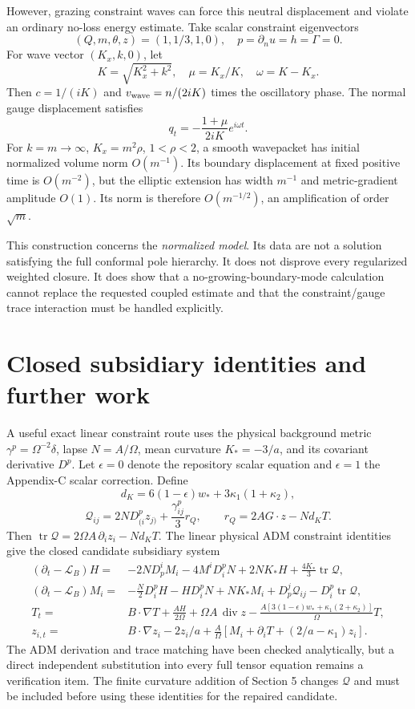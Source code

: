 \documentclass[11pt]{article}
\newcommand{\Tr}{\operatorname{tr}}
\begin{document}
However, grazing constraint waves can force this neutral displacement and violate an ordinary no-loss energy estimate. Take scalar constraint eigenvectors
\[
(Q,m,\theta,z)=(1,1/3,1,0),\quad p=\partial_nu=h=\Gamma=0.
\]
For wave vector $(K_x,k,0)$, let
\[
K=\sqrt{K_x^2+k^2},\quad \mu=K_x/K,\quad \omega=K-K_x.
\]
Then $c=1/(iK)$ and $v_{\rm wave}=n/(2iK)$ times the oscillatory phase. The normal gauge displacement satisfies
\[
q_t=-\frac{1+\mu}{2iK}e^{i\omega t}.
\]
For $k=m\to\infty$, $K_x=m^2\rho$, $1<\rho<2$, a smooth wavepacket has initial normalized volume norm $O(m^{-1})$. Its boundary displacement at fixed positive time is $O(m^{-2})$, but the elliptic extension has width $m^{-1}$ and metric-gradient amplitude $O(1)$. Its norm is therefore $O(m^{-1/2})$, an amplification of order $\sqrt m$.

This construction concerns the \emph{normalized model}. Its data are not a solution satisfying the full conformal pole hierarchy. It does not disprove every regularized weighted closure. It does show that a no-growing-boundary-mode calculation cannot replace the requested coupled estimate and that the constraint/gauge trace interaction must be handled explicitly.

\section{Closed subsidiary identities and further work}
A useful exact linear constraint route uses the physical background metric $\gamma^p=\Omega^{-2}\delta$, lapse $N=A/\Omega$, mean curvature $K_*=-3/a$, and its covariant derivative $D^p$. Let $\epsilon=0$ denote the repository scalar equation and $\epsilon=1$ the Appendix-C scalar correction. Define
\[
d_K=6(1-\epsilon)w_*+3\kappa_1(1+\kappa_2),
\]
\[
\mathcal Q_{ij}=2N D^p_{(i}z_{j)}+\frac{\gamma^p_{ij}}3 r_Q,
\qquad
r_Q=2A G\cdot z-Nd_KT .
\]
Then $\Tr\mathcal Q=2\Omega A\,\partial_i z_i-Nd_KT$.
The linear physical ADM constraint identities give the closed candidate subsidiary system
\begin{align}
(\partial_t-\mathcal L_B)H={}&-2N D_p^iM_i-4M^iD_i^pN+2NK_*H
+\frac{4K_*}{3}\Tr\mathcal Q,\\
(\partial_t-\mathcal L_B)M_i={}&-\frac N2 D_i^pH-H D_i^pN
+NK_*M_i+D_p^j\mathcal Q_{ij}-D_i^p\Tr\mathcal Q,\\
T_t={}&B\cdot\nabla T+\frac{AH}{2\Omega}
+\Omega A\,\operatorname{div}z
-\frac{A[3(1-\epsilon)w_*+\kappa_1(2+\kappa_2)]}{\Omega}T,\\
z_{i,t}={}&B\cdot\nabla z_i-2z_i/a
+\frac A\Omega[M_i+\partial_iT+(2/a-\kappa_1)z_i].
\end{align}
The ADM derivation and trace matching have been checked analytically, but a direct independent substitution into every full tensor equation remains a verification item. The finite curvature addition of Section 5 changes $\mathcal Q$ and must be included before using these identities for the repaired candidate.
\end{document}
